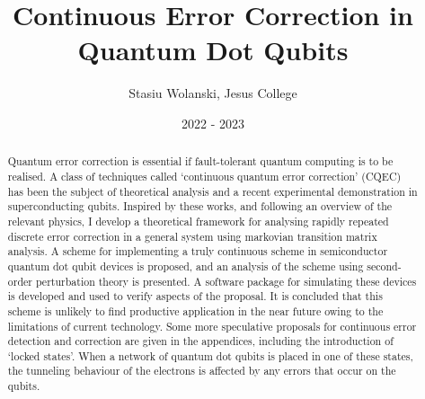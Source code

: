 \documentclass{report}
\title{Continuous Error Correction in Quantum Dot Qubits}
\author{Stasiu Wolanski, Jesus College}
\date{2022 - 2023}
\begin{document}
\maketitle

\begin{abstract}
Quantum error correction is essential if fault-tolerant quantum computing is to be realised. A class of techniques called `continuous quantum error correction' (CQEC) has been the subject of theoretical analysis and a recent experimental demonstration in superconducting qubits. Inspired by these works, and following an overview of the relevant physics, I develop a theoretical framework for analysing rapidly repeated discrete error correction in a general system using markovian transition matrix analysis. A scheme for implementing a truly continuous scheme in semiconductor quantum dot qubit devices is proposed, and an analysis of the scheme using second-order perturbation theory is presented. A software package for simulating these devices is developed and used to verify aspects of the proposal. It is concluded that this scheme is unlikely to find productive application in the near future owing to the limitations of current technology. Some more speculative proposals for continuous error detection and correction are given in the appendices, including the introduction of `locked states'. When a network of quantum dot qubits is placed in one of these states, the tunneling behaviour of the electrons is affected by any errors that occur on the qubits.
\end{abstract}

\tableofcontents
\end{document}
